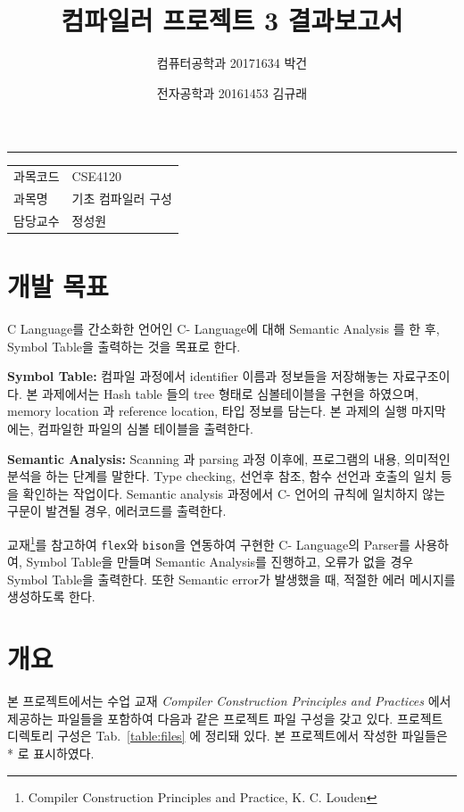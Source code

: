 \documentclass[a4paper, 12p]{paper}
\date{\vspace{-5ex}}
\title{컴파일러 프로젝트 3 결과보고서}
\author{컴퓨터공학과 20171634 박건}
\author{전자공학과 20161453 김규래}
\begin{document}
 
\maketitle\hrule{}\bigskip

\begin{center}
\begin{tabular}{ l l }
과목코드 & CSE4120 \\
과목명  & 기초 컴파일러 구성 \\
담당교수 & 정성원 \\
\end{tabular}
\end{center}

\section{개발 목표}
C Language를 간소화한 언어인 C- Language에 대해 Semantic Analysis 를 한 후, Symbol Table을 출력하는 것을 목표로 한다.

\vspace{0.1in}
\noindent\textbf{Symbol Table:} 컴파일 과정에서 identifier 이름과 정보들을 저장해놓는 자료구조이다. 본 과제에서는 Hash table 들의 tree 형태로 심볼테이블을 구현을 하였으며, memory location 과 reference location, 타입 정보를 담는다. 본 과제의 실행 마지막에는, 컴파일한 파일의 심볼 테이블을 출력한다.

\vspace{0.1in}
\noindent\textbf{Semantic Analysis:} Scanning 과 parsing 과정 이후에, 프로그램의 내용, 의미적인 분석을 하는 단계를 말한다. Type checking, 선언후 참조, 함수 선언과 호출의 일치 등을 확인하는 작업이다. Semantic analysis 과정에서 C- 언어의 규칙에 일치하지 않는 구문이 발견될 경우, 에러코드를 출력한다.

\vspace{0.1in}
교재\footnote{Compiler Construction Principles and Practice, K. C. Louden}를 참고하여 \texttt{flex}와 \texttt{bison}을 연동하여 구현한 C- Language의 Parser를 사용하여, Symbol Table을 만들며 Semantic Analysis를 진행하고, 오류가 없을 경우 Symbol Table을 출력한다. 또한 Semantic error가 발생했을 때, 적절한 에러 메시지를 생성하도록 한다.

\section{개요}
본 프로젝트에서는 수업 교재 \textit{Compiler Construction Principles and Practices} 에서 제공하는 파일들을 포함하여 다음과 같은 프로젝트 파일 구성을 갖고 있다. 프로젝트 디렉토리 구성은 Tab.~\ref{table:files} 에 정리돼 있다. 본 프로젝트에서 작성한 파일들은 * 로 표시하였다. 
\end{document}
